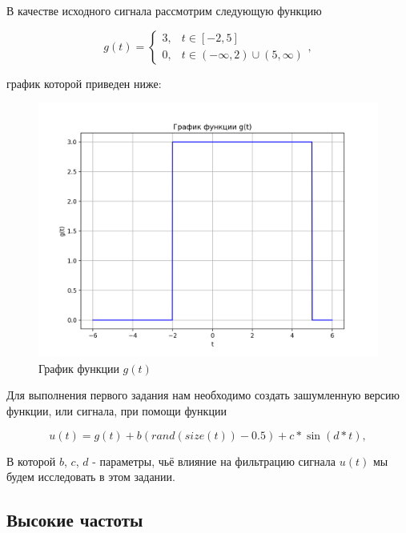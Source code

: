 В качестве исходного сигнала рассмотрим следующую функцию

\begin{equation}
    g(t)=\begin{cases}
        3, & t \in [-2, 5] \\
        0, & t \in (-\infty,2)\cup (5,\infty)

    \end{cases},
\end{equation}

график которой приведен ниже:

\begin{figure}[ht!]
    \centering
    \includegraphics[width=\textwidth]{media/1 task/high_freq/Initial.png}
    \caption{График функции $g(t)$}
    \label{fig:initial}
\end{figure}

\clearpage

Для выполнения первого задания нам необходимо создать зашумленную версию функции, или сигнала, при помощи функции

\begin{equation}
    u(t)=g(t)+b(rand(size(t))-0.5)+c*\sin(d*t),
\end{equation}

В которой $b$, $c$, $d$ - параметры, чьё влияние на фильтрацию сигнала $u(t)$ мы будем исследовать в этом задании.

\subsection{Высокие частоты}\label{high_freq}

